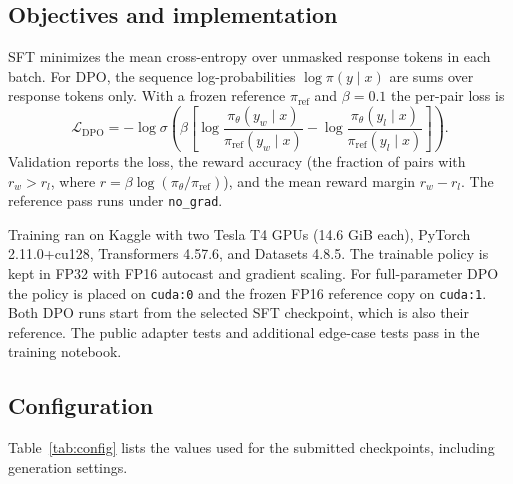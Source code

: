 \documentclass{article}
\newcommand{\code}[1]{\texttt{#1}}
\begin{document}
\subsection{Objectives and implementation}

SFT minimizes the mean cross-entropy over unmasked response tokens in each batch. For DPO, the sequence log-probabilities $\log\pi(y\mid x)$ are sums over response tokens only. With a frozen reference $\pi_{\mathrm{ref}}$ and $\beta=0.1$ the per-pair loss is
\begin{equation}
  \mathcal{L}_{\mathrm{DPO}}=-\log\sigma\!\left(\beta\left[\log\frac{\pi_\theta(y_w\mid x)}{\pi_{\mathrm{ref}}(y_w\mid x)}-\log\frac{\pi_\theta(y_l\mid x)}{\pi_{\mathrm{ref}}(y_l\mid x)}\right]\right).
\end{equation}
Validation reports the loss, the reward accuracy (the fraction of pairs with $r_w>r_l$, where $r=\beta\log(\pi_\theta/\pi_{\mathrm{ref}})$), and the mean reward margin $r_w-r_l$. The reference pass runs under \code{no\_grad}.

Training ran on Kaggle with two Tesla T4 GPUs (14.6 GiB each), PyTorch 2.11.0+cu128, Transformers 4.57.6, and Datasets 4.8.5. The trainable policy is kept in FP32 with FP16 autocast and gradient scaling. For full-parameter DPO the policy is placed on \code{cuda:0} and the frozen FP16 reference copy on \code{cuda:1}. Both DPO runs start from the selected SFT checkpoint, which is also their reference. The public adapter tests and additional edge-case tests pass in the training notebook.

\subsection{Configuration}

Table~\ref{tab:config} lists the values used for the submitted checkpoints, including generation settings.
\end{document}
